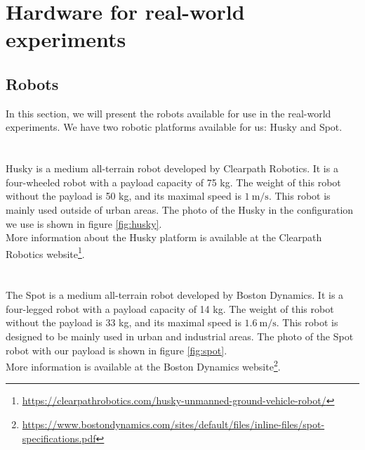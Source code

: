 \section{Hardware for real-world experiments}
    \subsection{Robots}
        In this section, we will present the robots available for use in the real-world experiments. We have two robotic platforms available for us: Husky and Spot.\\\\
        \\
        Husky is a medium all-terrain robot developed by Clearpath Robotics. It is a four-wheeled robot with a payload capacity of 75 kg. The weight of this robot without the payload is 50 kg, and its maximal speed is $1\:\si{\m\per\s}$. This robot is mainly used outside of urban areas. The photo of the Husky in the configuration we use is shown in figure \ref{fig:husky}.\\
        More information about the Husky platform is available at the Clearpath Robotics website\footnote{\url{https://clearpathrobotics.com/husky-unmanned-ground-vehicle-robot/}}.\\\\
        \\
        The Spot is a medium all-terrain robot developed by Boston Dynamics. It is a four-legged robot with a payload capacity of 14 kg. The weight of this robot without the payload is 33 kg, and its maximal speed is $1.6\:\si{\m\per\s}$. This robot is designed to be mainly used in urban and industrial areas. The photo of the Spot robot with our payload is shown in figure \ref{fig:spot}.\\
        More information is available at the Boston Dynamics website\footnote{\url{https://www.bostondynamics.com/sites/default/files/inline-files/spot-specifications.pdf}}.

